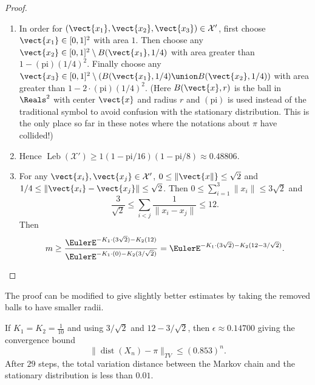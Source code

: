 \documentclass[12pt]{article}
\begin{document}
\begin{example}
\begin{proof}
\begin{enumerate}
            \item
                In order for \( (\vect{x_1}, \vect{x_2}, \vect{x_3}) \in
                \mathcal{X}' \), first choose \( \vect{x_1} \in [0,1]^2 \)
                with area \( 1 \).  Then choose any \( \vect{x_2} \in [0,1]^2
                \setminus B(\vect{x_1}, 1/4) \) with area greater than \(
                1 - (\text{pi})(1/4)^2 \).  Finally choose any \( \vect{x_3}
                \in [0,1]^2 \setminus (B(\vect{x_1}, 1/4) \union B(\vect
                {x_2}, 1/4)) \) with area greater than \( 1 - 2 \cdot (\text
                {pi})(1/4)^2 \).  (Here \( B(\vect{x}, r) \) is the ball
                in \( \Reals^2 \) with center \( \vect{x} \) and radius \(
                r \) and \( (\text{pi}) \) is used instead of the
                traditional symbol to avoid confusion with the
                stationary distribution.  This is the only place so far
                in these notes where the notations about \( \pi \) have
                collided!)
            \item
                Hence \(
                \operatorname{Leb}
                (\mathcal{X}') \ge 1 (1 - \text{pi}/16)(1 - \text{pi}/8)
                \approx 0.48806 \).
            \item
                For any \( \vect{x_i}, \vect{x_j} \in \mathcal{X}' \), \(
                0 \le \|\vect{x\|} \le \sqrt{2} \) and \( 1/4 \le \|
                \vect{x_i} - \vect{x_j}\| \le \sqrt{2} \). Then \( 0 \le
                \sum\limits_{i=1}^3 \|x_i\|\le 3 \sqrt{2} \) and
                \[
                    \frac{3}{\sqrt{2}} \le \sum\limits_{i<j} \frac{1}{\|
                    x_i - x_j \|} \le 12.
                \] Then
                \[
                    m \ge \frac{\EulerE^{-K_1 \cdot (3 \sqrt{2}) - K_2(12)}}
                    {\EulerE^ {-K_1 \cdot (0) - K_2(3/\sqrt{2})}} =
                    \EulerE^{-K_1 \cdot (3 \sqrt{2}) - K_2(12- 3/\sqrt{2})}.
                \]
        \end{enumerate}
    \end{proof}

    \begin{remark}
        The proof can be modified to give slightly better estimates by
        taking the removed balls to have smaller radii.
    \end{remark}

    If \( K_1 = K_2 = \frac{1}{10} \) and using \( 3/\sqrt{2} \) and \(
    12 - 3/\sqrt{2} \), then \( \epsilon \approx 0.14700 \) giving the
    convergence bound
    \[
        \|
        \operatorname{dist}
        (X_n) - \pi \|_{TV} \le (0.853)^n.
    \] After \( 29 \) steps, the total variation distance between the
    Markov chain and the stationary distribution is less than \( 0.01 \).

\end{example}
\end{document}
